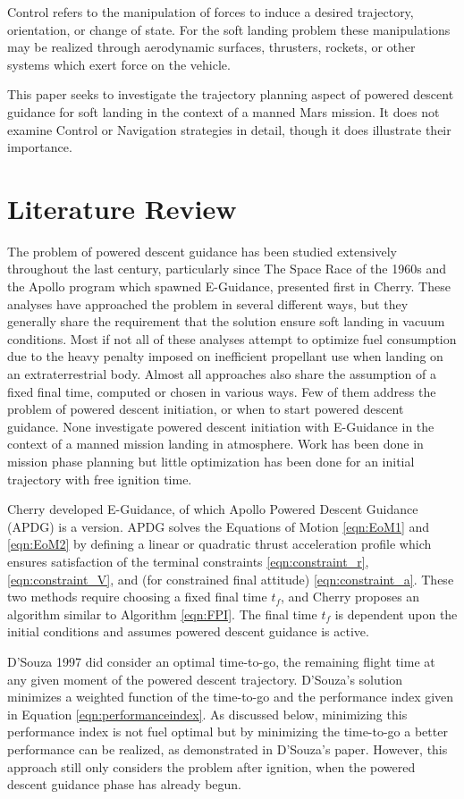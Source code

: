 Control refers to the manipulation of forces to induce a desired trajectory, orientation, or change of state. For the soft landing problem these manipulations may be realized through aerodynamic surfaces, thrusters, rockets, or other systems which exert force on the vehicle.

This paper seeks to investigate the trajectory planning aspect of powered descent guidance for soft landing in the context of a manned Mars mission. It does not examine Control or Navigation strategies in detail, though it does illustrate their importance.

\section{Literature Review}
The problem of powered descent guidance has been studied extensively throughout the last century, particularly since The Space Race of the 1960s and the Apollo program which spawned E-Guidance, presented first in Cherry\:\cite{CHERRY}. These analyses have approached the problem in several different ways, but they generally share the requirement that the solution ensure soft landing in vacuum conditions. Most if not all of these analyses attempt to optimize fuel consumption due to the heavy penalty imposed on inefficient propellant use when landing on an extraterrestrial body. Almost all approaches also share the assumption of a fixed final time, computed or chosen in various ways. Few of them address the problem of powered descent initiation, or when to start powered descent guidance. None investigate powered descent initiation with E-Guidance in the context of a manned mission landing in atmosphere. Work has been done in mission phase planning but little optimization has been done for an  initial trajectory with free ignition time.

Cherry developed E-Guidance, of which Apollo Powered Descent Guidance (APDG) is a version. APDG solves the Equations of Motion \ref{eqn:EoM1} and \ref{eqn:EoM2} by defining a linear or quadratic thrust acceleration profile which ensures satisfaction of the terminal constraints \ref{eqn:constraint_r}, \ref{eqn:constraint_V}, and (for constrained final attitude) \ref{eqn:constraint_a}. These two methods require choosing a fixed final time $t_f$, and Cherry proposes an algorithm similar to Algorithm \ref{eqn:FPI}. The final time $t_f$ is dependent upon the initial conditions and assumes powered descent guidance is active.

D'Souza 1997\:\cite{DSOUZA} did consider an optimal time-to-go, the remaining flight time at any given moment of the powered descent trajectory. D'Souza's solution minimizes a weighted function of the time-to-go and the performance index given in Equation \ref{eqn:performanceindex}. As discussed below, minimizing this performance index is not fuel optimal but by minimizing the time-to-go a better performance can be realized, as demonstrated in D'Souza's paper. However, this approach still only considers the problem after ignition, when the powered descent guidance phase has already begun.


